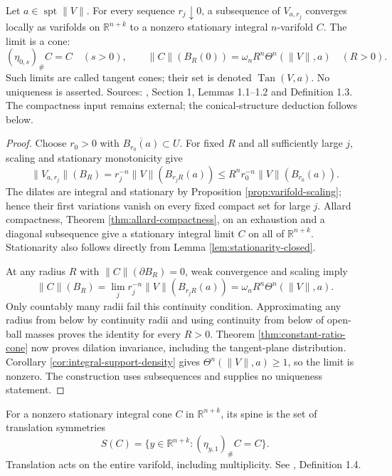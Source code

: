 \begin{theorem}\label{thm:tangent-cones}
Let $a\in\operatorname{spt}\|V\|$. For every sequence $r_j\downarrow0$, a subsequence of $V_{a,r_j}$ converges locally as varifolds on $\mathbb R^{n+k}$ to a nonzero stationary integral $n$-varifold $C$. The limit is a cone:
\[
 (\eta_{0,s})_\#C=C\quad(s>0),\qquad
 \|C\|(B_R(0))=\omega_n R^n\Theta^n(\|V\|,a)\quad(R>0).
\]
Such limits are called tangent cones; their set is denoted $\operatorname{Tan}(V,a)$. No uniqueness is asserted. Sources: \cite{Minter}, Section 1, Lemmas 1.1--1.2 and Definition 1.3. The compactness input remains external; the conical-structure deduction follows below.
\end{theorem}
\begin{proof}
Choose $r_0>0$ with $\overline{B_{r_0}(a)}\subset U$. For fixed $R$ and all sufficiently large $j$, scaling and stationary monotonicity give
\[
 \|V_{a,r_j}\|(B_R)=r_j^{-n}\|V\|(B_{r_jR}(a))
 \leq R^n r_0^{-n}\|V\|(B_{r_0}(a)).
\]
The dilates are integral and stationary by Proposition \ref{prop:varifold-scaling}; hence their first variations vanish on every fixed compact set for large $j$. Allard compactness, Theorem \ref{thm:allard-compactness}, on an exhaustion and a diagonal subsequence give a stationary integral limit $C$ on all of $\mathbb R^{n+k}$. Stationarity also follows directly from Lemma \ref{lem:stationarity-closed}.

At any radius $R$ with $\|C\|(\partial B_R)=0$, weak convergence and scaling imply
\[
 \|C\|(B_R)=\lim_j r_j^{-n}\|V\|(B_{r_jR}(a))
            =\omega_nR^n\Theta^n(\|V\|,a).
\]
Only countably many radii fail this continuity condition. Approximating any radius from below by continuity radii and using continuity from below of open-ball masses proves the identity for every $R>0$. Theorem \ref{thm:constant-ratio-cone} now proves dilation invariance, including the tangent-plane distribution. Corollary \ref{cor:integral-support-density} gives $\Theta^n(\|V\|,a)\geq1$, so the limit is nonzero. The construction uses subsequences and supplies no uniqueness statement.
\end{proof}

\begin{definition}\label{def:cone-spine}
For a nonzero stationary integral cone $C$ in $\mathbb R^{n+k}$, its spine is the set of translation symmetries
\[
 S(C)=\{y\in\mathbb R^{n+k}:(\eta_{y,1})_\#C=C\}.
\]
Translation acts on the entire varifold, including multiplicity. See \cite{Minter}, Definition 1.4.
\end{definition}

